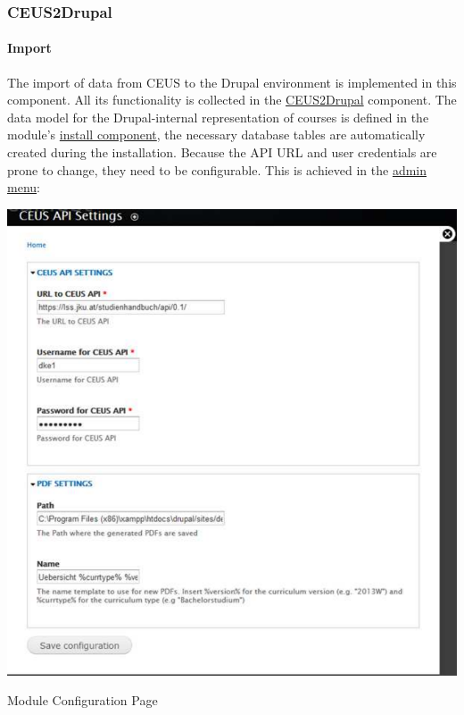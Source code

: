 \hypertarget{index_CEUS2Drupal}{}\subsubsection{C\+E\+U\+S2\+Drupal}\label{index_CEUS2Drupal}
\hypertarget{index_Import}{}\paragraph{Import}\label{index_Import}
The import of data from C\+E\+U\+S to the Drupal environment is implemented in this component. All its functionality is collected in the \hyperlink{index_CEUS2Drupal}{C\+E\+U\+S2\+Drupal} component. The data model for the Drupal-\/internal representation of courses is defined in the module's \hyperlink{stukowin_8install}{install component}, the necessary database tables are automatically created during the installation. Because the A\+P\+I U\+R\+L and user credentials are prone to change, they need to be configurable. This is achieved in the \hyperlink{group___stukowin___module_ga55d453d5b6f8ae4e643308d8814e67a5}{admin menu}\+:


\begin{DoxyImage}
\includegraphics[width=\textwidth]{ModuleConfiguration}
\caption{Module Configuration Page}
\end{DoxyImage}


